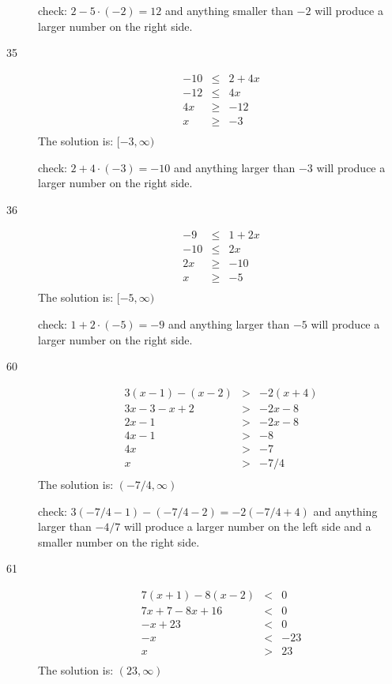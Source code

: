 \documentclass[fleqn,addpoints]{exam}
\begin{document}
\begin{description}
check: \( 2 - 5 \cdot (-2) = 12\) and anything smaller than $-2$ will produce a larger number on the right side.

\item[35]
\begin{eqnarray*}
  -10 &\leq& 2 + 4x \\
  -12 &\leq& 4x \\
  4x &\geq& -12 \\
  x &\geq& -3 \\
\end{eqnarray*}
The solution is: \( [-3, \infty) \)

check: \( 2 + 4 \cdot (-3) = -10\) and anything larger than $-3$ will produce a larger number on the right side.

\item[36]
\begin{eqnarray*}
  -9 &\leq& 1 + 2x \\
  -10 &\leq& 2x \\
   2x &\geq& -10 \\
   x &\geq& -5 \\
\end{eqnarray*}
The solution is: \( [-5, \infty) \)

check: \( 1 + 2 \cdot (-5) = -9\) and anything larger than $-5$ will produce a larger number on the right side.

\item[60]
\begin{eqnarray*}
  3(x - 1) - (x - 2) &>& -2(x + 4) \\
  3x - 3 - x + 2 &>& -2x - 8 \\
  2x - 1 &>& -2x - 8 \\
  4x - 1 &>& -8 \\
  4x &>& -7 \\
  x &>& -7/4 \\
\end{eqnarray*}
The solution is: \( (-7/4, \infty) \)

check: \( 3(-7/4 - 1) - (-7/4 - 2) = -2(-7/4 + 4)  \) and anything larger than $-4/7$ will produce a larger number on
the left side and a smaller number on the right side.

\item[61]
\begin{eqnarray*}
  7(x + 1) - 8(x - 2) &<& 0 \\
  7x + 7 - 8x + 16 &<& 0 \\
  -x + 23 &<& 0 \\
  -x &<& -23 \\
  x &>& 23 \\
\end{eqnarray*}
The solution is: \( (23, \infty) \)


\end{description}
\end{document}
